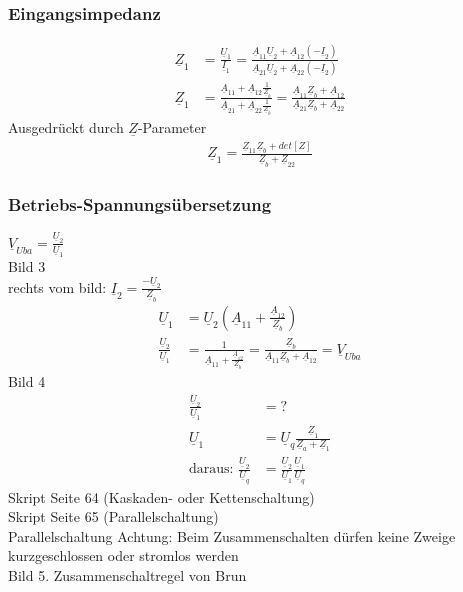 \subsubsection{Eingangsimpedanz}
\begin{align}
	\underline{Z}_1&=\frac{\underline{U}_1}{\underline{I}_1}=\frac{\underline{A}_{11}\underline{U}_{2}+\underline{A}_{12}\left(-\underline{I}_2\right)}{\underline{A}_{21}\underline{U}_2+\underline{A}_{22}\left(-\underline{I}_2\right)}\nonumber\\
	\underline{Z}_1&=\frac{\underline{A}_{11}+\underline{A}_{12}\frac{1}{\underline{Z}_b}}{\underline{A}_{21}+\underline{A}_{22}\frac{1}{\underline{Z}_b}}=\frac{\underline{A}_{11}\underline{Z}_b+\underline{A}_{12}}{\underline{A}_{21}\underline{Z}_b+\underline{A}_{22}}\nonumber
\end{align}
Ausgedrückt durch $\underline{Z}$-Parameter
\begin{align}
	\underline{Z}_1=\frac{\underline{Z}_{11}\underline{Z}_b+det[Z]}{\underline{Z}_b+\underline{Z}_{22}}\nonumber
\end{align}
\subsubsection{Betriebs-Spannungsübersetzung}
$\underline{V}_{Uba}=\frac{\underline{U}_{2}}{\underline{U}_{1}}$\\
Bild 3\\
rechts vom bild:
$\underline{I}_{2}=\frac{-\underline{U}_{2}}{\underline{Z}_{b}}$\\
\begin{align}
	\underline{U}_{1}&=\underline{U}_{2}\left(\underline{A}_{11}+\frac{\underline{A}_{12}}{\underline{Z}_{b}}\right)\nonumber\\
	\frac{\underline{U}_{2}}{\underline{U}_{1}}&=\frac{1}{\underline{A}_{11}+\frac{\underline{A}_{12}}{\underline{Z}_{b}}}=\frac{\underline{Z}_{b}}{\underline{A}_{11}\underline{Z}_{b}+\underline{A}_{12}}=\underline{V}_{Uba}\nonumber
\end{align}
Bild 4\\
\begin{align}
 	\frac{\underline{U}_{2}}{\underline{U}_{1}}&=?\nonumber\\
	\underline{U}_{1}&=\underline{U}_{q}\frac{\underline{Z}_{1}}{\underline{Z}_{a}+\underline{Z}_{1}}\nonumber\\
	\text{daraus: }
	\frac{\underline{U}_{2}}{\underline{U}_{q}}&=\frac{\underline{U}_{2}}{\underline{U}_{1}}\frac{\underline{U}_{1}}{\underline{U}_{q}}\nonumber
\end{align}
Skript Seite 64 (Kaskaden- oder Kettenschaltung)\\
Skript Seite 65 (Parallelschaltung)\\
Parallelschaltung Achtung: Beim Zusammenschalten dürfen keine Zweige
kurzgeschlossen oder stromlos werden\\
Bild 5. Zusammenschaltregel von Brun\\
